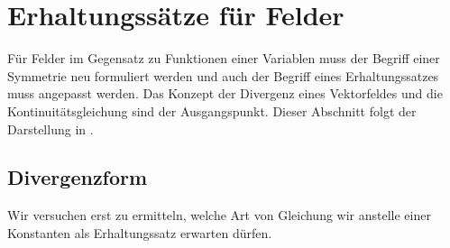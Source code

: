 %
%
\section{Erhaltungssätze für Felder
\label{buch:symmetrien:felder}}
Für Felder im Gegensatz zu Funktionen einer Variablen muss der
Begriff einer Symmetrie neu formuliert werden und auch der Begriff
eines Erhaltungssatzes muss angepasst werden.
Das Konzept der Divergenz eines Vektorfeldes
und die Kontinuitätsgleichung sind der Ausgangspunkt.
Dieser Abschnitt folgt der Darstellung in \cite[section 8.6]{buch:pde}.

%
%
\subsection{Divergenzform
\label{buch:symmetrien:felder:subsection:divergenzform}}
Wir versuchen erst zu ermitteln, welche Art von Gleichung wir anstelle
einer Konstanten als Erhaltungssatz erwarten dürfen.

%
%

